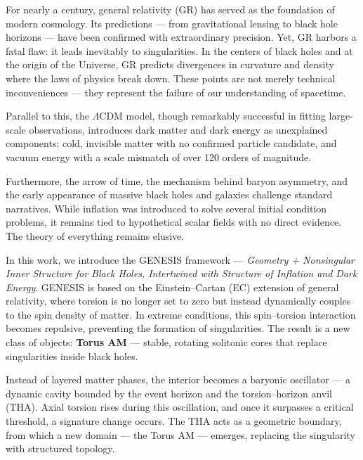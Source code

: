 \documentclass{article}
\begin{document}
For nearly a century, general relativity (GR) has served as the foundation of modern cosmology. Its predictions — from gravitational lensing to black hole horizons — have been confirmed with extraordinary precision. Yet, GR harbors a fatal flaw: it leads inevitably to singularities. In the centers of black holes and at the origin of the Universe, GR predicts divergences in curvature and density where the laws of physics break down. These points are not merely technical inconveniences — they represent the failure of our understanding of spacetime.

Parallel to this, the $\Lambda$CDM model, though remarkably successful in fitting large-scale observations, introduces dark matter and dark energy as unexplained components: cold, invisible matter with no confirmed particle candidate, and vacuum energy with a scale mismatch of over 120 orders of magnitude.

Furthermore, the arrow of time, the mechanism behind baryon asymmetry, and the early appearance of massive black holes and galaxies challenge standard narratives. While inflation was introduced to solve several initial condition problems, it remains tied to hypothetical scalar fields with no direct evidence. The theory of everything remains elusive.

\vspace{1ex}

In this work, we introduce the GENESIS framework — \emph{Geometry + Nonsingular Inner Structure for Black Holes, Intertwined with Structure of Inflation and Dark Energy}. GENESIS is based on the Einstein–Cartan (EC) extension of general relativity, where torsion is no longer set to zero but instead dynamically couples to the spin density of matter. In extreme conditions, this spin–torsion interaction becomes repulsive, preventing the formation of singularities. The result is a new class of objects: \textbf{Torus AM} — stable, rotating solitonic cores that replace singularities inside black holes.



Instead of layered matter phases, the interior becomes a baryonic oscillator — a dynamic cavity bounded by the event horizon and the torsion–horizon anvil (THA). Axial torsion rises during this oscillation, and once it surpasses a critical threshold, a signature change occurs. The THA acts as a geometric boundary, from which a new domain — the Torus AM — emerges, replacing the singularity with structured topology.
\end{document}
